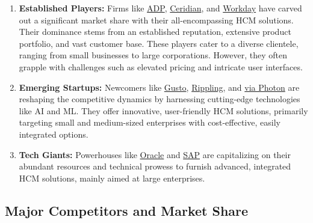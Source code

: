 \documentclass[
  a4paper,
]{book}
\renewcommand{\labelenumi}{\textbf{\textcolor{com-color}{\arabic*.}}}%
\begin{document}
\begin{enumerate}
\def\labelenumi{\arabic{enumi}.}
\item
  \textbf{Established Players:} Firms like
  \href{https://www.adp.com/}{ADP},
  \href{https://www.ceridian.com/}{Ceridian}, and
  \href{https://www.workday.com/}{Workday} have carved out a significant
  market share with their all-encompassing HCM solutions. Their
  dominance stems from an established reputation, extensive product
  portfolio, and vast customer base. These players cater to a diverse
  clientele, ranging from small businesses to large corporations.
  However, they often grapple with challenges such as elevated pricing
  and intricate user interfaces.
\item
  \textbf{Emerging Startups:} Newcomers like
  \href{https://gusto.com/}{Gusto},
  \href{https://www.rippling.com/}{Rippling}, and
  \href{https://www.viaphoton.com/}{via Photon} are reshaping the
  competitive dynamics by harnessing cutting-edge technologies like AI
  and ML. They offer innovative, user-friendly HCM solutions, primarily
  targeting small and medium-sized enterprises with cost-effective,
  easily integrated options.
\item
  \textbf{Tech Giants:} Powerhouses like
  \href{https://www.oracle.com/}{Oracle} and
  \href{https://www.sap.com/}{SAP} are capitalizing on their abundant
  resources and technical prowess to furnish advanced, integrated HCM
  solutions, mainly aimed at large enterprises.
\end{enumerate}

\hypertarget{major-competitors-and-market-share}{%
\subsection{Major Competitors and Market
Share}\label{major-competitors-and-market-share}}
\end{document}
